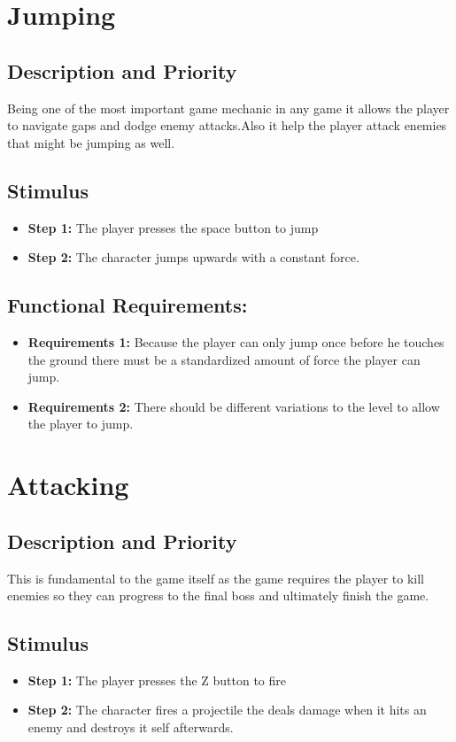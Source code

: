 \section{Jumping}
\subsection{Description and Priority}
Being one of the most important game mechanic in any game it allows the player to navigate gaps and dodge enemy attacks.Also it help the player attack enemies that might be jumping as well.
\subsection{Stimulus}
\begin{itemize}
    \item \textbf{Step 1:} The player presses the space button to jump
    \item \textbf{Step 2:} The character jumps upwards with a constant force.
\end{itemize}
\subsection{Functional Requirements:}
\begin{itemize}
    \item \textbf{Requirements 1:} Because the player can only jump once before he touches the ground there must be a standardized amount of force the player can jump.
    \item \textbf{Requirements 2:} There should be different variations to the level to allow the player to jump.
\end{itemize}

\section{Attacking}
\subsection{Description and Priority}
This is fundamental to the game itself as the game requires the player to kill enemies so they can progress to the final boss and ultimately finish the game.
\subsection{Stimulus}
\begin{itemize}
    \item \textbf{Step 1:} The player presses the Z button to fire
    \item \textbf{Step 2:} The character fires a projectile the deals damage when it hits an enemy and destroys it self afterwards.
\end{itemize}
